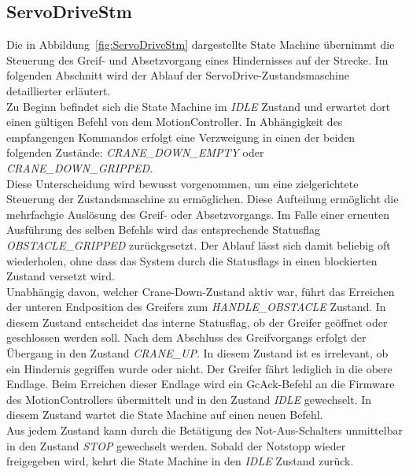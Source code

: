 \documentclass[main.tex]{subfiles} %
\begin{document}
\subsection{ServoDriveStm}
Die in Abbildung~\ref{fig:ServoDriveStm} dargestellte State Machine übernimmt die Steuerung des Greif- und Absetzvorgang eines Hindernisses auf der Strecke.
Im folgenden Abschnitt wird der Ablauf der ServoDrive-Zustandsmaschine detaillierter erläutert.\\
Zu Beginn befindet sich die State Machine im \textit{IDLE} Zustand und erwartet dort einen gültigen Befehl von dem MotionController.
In Abhängigkeit des empfangengen Kommandos erfolgt eine Verzweigung in einen der beiden folgenden Zustände:
\textit{CRANE\_DOWN\_EMPTY} oder \textit{CRANE\_DOWN\_GRIPPED}.\\
Diese Unterscheidung wird bewusst vorgenommen, um eine zielgerichtete Steuerung der Zustandsmaschine zu ermöglichen.
Diese Aufteilung ermöglicht die mehrfachgie Auslösung des Greif- oder Absetzvorgangs. Im Falle einer erneuten Ausführung des selben
Befehls wird das entsprechende Statusflag \textit{OBSTACLE\_GRIPPED} zurückgesetzt. Der Ablauf lässt sich damit beliebig oft wiederholen,
ohne dass das System durch die Statusflags in einen blockierten Zustand versetzt wird.\\
Unabhängig davon, welcher Crane-Down-Zustand aktiv war, führt das Erreichen der unteren Endposition des Greifers
zum \textit{HANDLE\_OBSTACLE} Zustand. In diesem Zustand entscheidet das interne Statusflag, ob der Greifer geöffnet
oder geschlossen werden soll. Nach dem Abschluss des Greifvorgangs erfolgt der Übergang in den Zustand \textit{CRANE\_UP}.
In diesem Zustand ist es irrelevant, ob ein Hindernis gegriffen wurde oder nicht. Der Greifer fährt lediglich in die obere Endlage.
Beim Erreichen dieser Endlage wird ein GcAck-Befehl an die Firmware des MotionControllers übermittelt und in 
den Zustand \textit{IDLE} gewechselt. In diesem Zustand wartet die State Machine auf einen neuen Befehl.\\
Aus jedem Zustand kann durch die Betätigung des Not-Aus-Schalters unmittelbar in den Zustand \textit{STOP} gewechselt
werden. Sobald der Notstopp wieder freigegeben wird, kehrt die State Machine in den \textit{IDLE} Zustand zurück.
\end{document}
